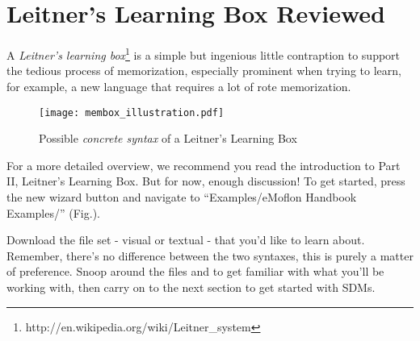 \section{Leitner's Learning Box Reviewed}

A \emph{Leitner's learning box}\footnote{http://en.wikipedia.org/wiki/Leitner\_system} is a simple but ingenious little contraption to support the tedious
process of memorization, especially prominent when trying to learn, for example, a new language that requires a lot of rote memorization.


\begin{figure}[htbp]
	\centering
  \texttt{[image: membox\_illustration.pdf]}
	\caption{Possible \emph{concrete syntax} of a Leitner's Learning Box}
	\label{fig:membox_depiction}
\end{figure}
\FloatBarrier

For a more detailed overview, we recommend you read the introduction to Part II, Leitner's Learning Box. But for now, enough discussion! To get started, press
the new wizard button and navigate to ``Examples/eMoflon Handbook Examples/'' (Fig.).


Download the file set - visual or textual - that you'd like to learn about. Remember, there's no difference between the two syntaxes, this is purely a matter of
preference. Snoop around the files and to get familiar with what you'll be working with, then carry on to the next section to get started with SDMs.
